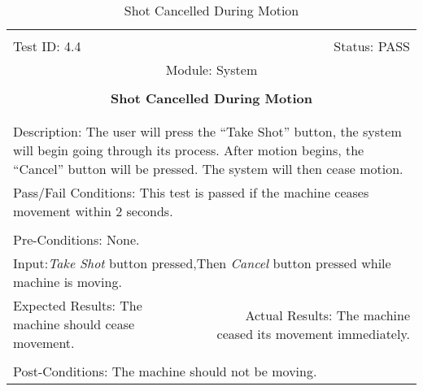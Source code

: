 \documentclass[titlepage]{article}
\begin{document}
\begin{center}
\begin{table}[h!]
\begin{tabular}{|l r|}\hline&\\[-2mm]
	Test ID: 4.4	&Status: PASS\\[-3mm]
	\multicolumn{2}{|c|}{Module: System}\\&\\
	\multicolumn{2}{|c|}{\textbf{\large{Shot Cancelled During Motion}}}\\&\\\hline&\\[-3mm]
	\multicolumn{2}{|p{\textwidth}|}{Description: The user will press the ``Take Shot'' button, the system will begin going through its process. After motion begins, the ``Cancel'' button will be pressed. The system will then cease motion.}\\\hline
	\multicolumn{2}{|p{\textwidth}|}{Pass/Fail Conditions: This test is passed if the machine ceases movement within 2 seconds.}\\[1mm]\hline&\\[-3mm]
	\multicolumn{2}{|p{\textwidth}|}{Pre-Conditions: None.}\\[4mm]
	\multicolumn{2}{|p{\textwidth}|}{Input:\newline\textit{Take Shot} button pressed,\newline Then \textit{Cancel} button pressed while machine is moving.}\\[2mm]\hline
	\multicolumn{1}{|p{0.49\textwidth}}{Expected Results: The machine should cease movement.}	&\multicolumn{1}{|p{0.45\textwidth}|}{Actual Results: The machine ceased its movement immediately.}\\\hline&\\[-3mm]
	\multicolumn{2}{|p{\textwidth}|}{Post-Conditions: The machine should not be moving.}\\\hline
\end{tabular}
\caption{Shot Cancelled During Motion}
\end{table}
\end{center}
\newpage
\end{document}
